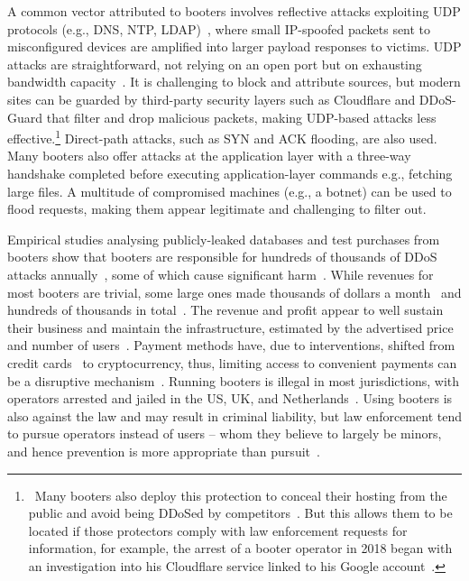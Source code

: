 \documentclass[letterpaper,twocolumn,10pt]{article}
\begin{document}
A common vector attributed to booters involves reflective attacks exploiting UDP protocols (e.g., DNS, NTP, LDAP)~\cite{krupp2017linking}, where small IP-spoofed packets sent to misconfigured devices are amplified into larger payload responses to victims. UDP attacks are straightforward, not relying on an open port but on exhausting bandwidth capacity~\cite{santanna2015booters}. It is challenging to block and attribute sources, but modern sites can be guarded by third-party security layers such as Cloudflare and DDoS-Guard that filter and drop malicious packets, making UDP-based attacks less effective.\footnote{~Many booters also deploy this protection to conceal their hosting from the public and avoid being DDoSed by competitors~\cite{santanna2015booters}. But this allows them to be located if those protectors comply with law enforcement requests for information, for example, the arrest of a booter operator in 2018 began with an investigation into his Cloudflare service linked to his Google account~\cite{gatrelcase}.} Direct-path attacks, such as SYN and ACK flooding, are also used. Many booters also offer attacks at the application layer with a three-way handshake completed before executing application-layer commands e.g., fetching large files. A multitude of compromised machines (e.g., a botnet) can be used to flood requests, making them appear legitimate and challenging to filter out.

Empirical studies analysing publicly-leaked databases and test purchases from booters show that booters are responsible for hundreds of thousands of DDoS attacks annually~\cite{karami2016stress, karami2013understanding}, some of which cause significant harm~\cite{santanna2015booters}. While revenues for most booters are trivial, some large ones made thousands of dollars a month~\cite{karami2013understanding} and hundreds of thousands in total~\cite{titaniumstresserarrest, vdosleak}. The revenue and profit appear to well sustain their business and maintain the infrastructure, estimated by the advertised price and number of users~\cite{smirnova2024exploring}. Payment methods have, due to interventions, shifted from credit cards~\cite{vdospaypalintervention} to cryptocurrency, thus, limiting access to convenient payments can be a disruptive mechanism~\cite{karami2016stress,brunt2017booted}. Running booters is illegal in most jurisdictions, with operators arrested and jailed in the US, UK, and Netherlands~\cite{collier2019booting}. Using booters is also against the law and may result in criminal liability, but law enforcement tend to pursue operators instead of users -- whom they believe to largely be minors, and hence prevention is more appropriate than pursuit~\cite{hutchings2016exploring}.
\end{document}
